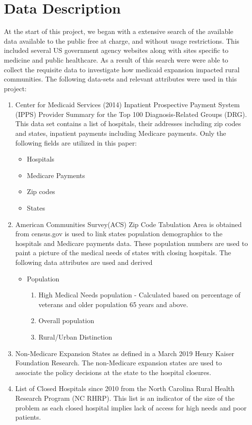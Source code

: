 \documentclass[10pt,conference]{IEEEtran}
\begin{document}
\section{Data Description}
At the start of this project, we began with a extensive search of the available data available to the public free at charge, and without usage restrictions. This included several US government agency websites along with sites specific to medicine and public healthcare. As a result of this search were were able to collect the requisite data to investigate how medicaid expansion impacted rural communities. The following data-sets and relevant attributes were used in this project:
\begin{enumerate}
    \item Center for Medicaid Services (2014) Inpatient Prospective Payment System (IPPS) Provider Summary for the Top 100 Diagnosis-Related Groups (DRG). This data set contains a list of hospitals, their addresses including zip codes and states, inpatient payments including Medicare payments. Only the following fields are utilized in this paper:
    \begin{itemize}
        \item Hospitals
        \item Medicare Payments
        \item Zip codes
        \item States
    \end{itemize}
    \item American Communities Survey(ACS) Zip Code Tabulation Area is obtained from census.gov is used to link states population demographics to the hospitals and Medicare payments data. These population numbers are used to paint a picture of the medical needs of states with closing hospitals. The following data attributes are used and derived
    \begin{itemize}
        \item Population
        \begin{enumerate}
            \item High Medical Needs population - Calculated based on percentage of veterans and older population 65 years and above.
            \item Overall population
            \item Rural/Urban Distinction
        \end{enumerate}
    \end{itemize}
    \item Non-Medicare Expansion States as defined in a March 2019 Henry Kaiser Foundation Research. The non-Medicare expansion states are used to associate the policy decisions at the state to the hospital closures.
    \item List of Closed Hospitals since 2010 from the  North Carolina Rural Health Research Program (NC RHRP). This list is an indicator of the size of the problem as each closed hospital implies lack of access for high needs and poor patients. 
\end{enumerate}
    
\end{document}
